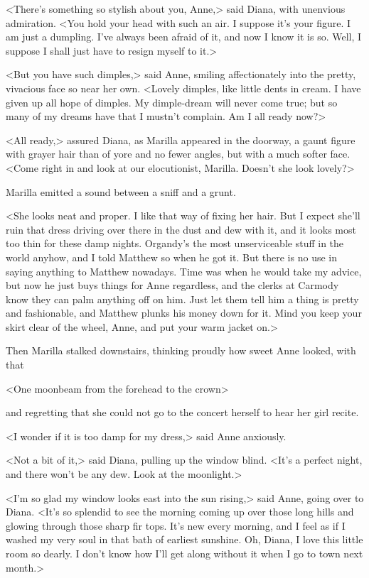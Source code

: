 <There's something so stylish about you, Anne,> said Diana, with unenvious admiration. <You hold your head with such an air. I suppose it's your figure. I am just a dumpling. I've always been afraid of it, and now I know it is so. Well, I suppose I shall just have to resign myself to it.>

<But you have such dimples,> said Anne, smiling affectionately into the pretty, vivacious face so near her own. <Lovely dimples, like little dents in cream. I have given up all hope of dimples. My dimple-dream will never come true; but so many of my dreams have that I mustn't complain. Am I all ready now?>

<All ready,> assured Diana, as Marilla appeared in the doorway, a gaunt figure with grayer hair than of yore and no fewer angles, but with a much softer face. <Come right in and look at our elocutionist, Marilla. Doesn't she look lovely?>

Marilla emitted a sound between a sniff and a grunt.

<She looks neat and proper. I like that way of fixing her hair. But I expect she'll ruin that dress driving over there in the dust and dew with it, and it looks most too thin for these damp nights. Organdy's the most unserviceable stuff in the world anyhow, and I told Matthew so when he got it. But there is no use in saying anything to Matthew nowadays. Time was when he would take my advice, but now he just buys things for Anne regardless, and the clerks at Carmody know they can palm anything off on him. Just let them tell him a thing is pretty and fashionable, and Matthew plunks his money down for it. Mind you keep your skirt clear of the wheel, Anne, and put your warm jacket on.>

Then Marilla stalked downstairs, thinking proudly how sweet Anne looked, with that

<One moonbeam from the forehead to the crown>

and regretting that she could not go to the concert herself to hear her girl recite.

<I wonder if it is too damp for my dress,> said Anne anxiously.

<Not a bit of it,> said Diana, pulling up the window blind. <It's a perfect night, and there won't be any dew. Look at the moonlight.>

<I'm so glad my window looks east into the sun rising,> said Anne, going over to Diana. <It's so splendid to see the morning coming up over those long hills and glowing through those sharp fir tops. It's new every morning, and I feel as if I washed my very soul in that bath of earliest sunshine. Oh, Diana, I love this little room so dearly. I don't know how I'll get along without it when I go to town next month.>

